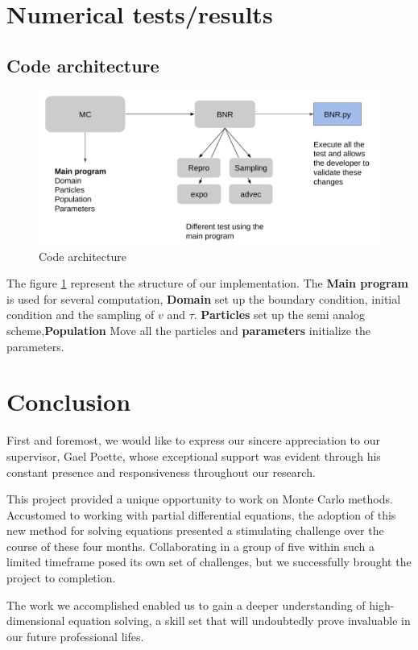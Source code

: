 \documentclass[a4paper, 11pt]{article}
\begin{document}
\section{Numerical tests/results}

\subsection{Code architecture}


\begin{figure}[H]
	\centering
	\includegraphics[width=1.0\linewidth]{codestruct.png}
	\caption {Code architecture}
	\label{fig:code}
\end{figure}

The figure \ref{fig:code} represent the structure of our implementation. The \textbf{Main program} is used for several computation, \textbf{Domain} set up the boundary condition, initial condition and the sampling of $v$ and $\tau$. \textbf{Particles} set up the semi analog scheme,\textbf{Population} Move all the particles and \textbf{parameters} initialize the parameters.

\section{Conclusion}

First and foremost, we would like to express our sincere appreciation to our supervisor, Gael Poette, whose exceptional support was evident through his constant presence and responsiveness throughout our research.

This project provided a unique opportunity to work on Monte Carlo methods. Accustomed to working with partial differential equations, the adoption of this new method for solving equations presented a stimulating challenge over the course of these four months. Collaborating in a group of five within such a limited timeframe posed its own set of challenges, but we successfully brought the project to completion.

The work we accomplished enabled us to gain a deeper understanding of high-dimensional equation solving, a skill set that will undoubtedly prove invaluable in our future professional lifes.
	
	
\end{document}
